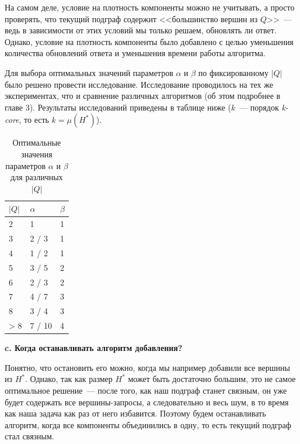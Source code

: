На самом деле, условие на плотность компоненты можно не учитывать, а просто проверять, что текущий подграф содержит <<большинство вершин из $Q$>>~--- ведь в зависимости от этих условий мы только решаем, обновлять ли ответ. Однако, условие на плотность компоненты было добавлено с целью уменьшения количества обновлений ответа и уменьшения времени работы алгоритма.

Для выбора оптимальных значений параметров $\alpha$ и $\beta$ по фиксированному $|Q|$ было решено провести исследование. Исследование проводилось на тех же экспериментах, что и сравнение различных алгоритмов (об этом подробнее в главе $3$). Результаты исследований приведены в таблице ниже ($k$~--- порядок \textit{k-core}, то есть $k = \mu(H^*)$).

\begin{table}[!h]
\centering
\caption{Оптимальные значения параметров $\alpha$ и $\beta$ для различных $|Q|$}\label{parameters-research}
  \begin{tabular}{| l | l | p{1cm} |}
  \hline
  $|Q|$ & $\alpha$ & $\beta$ \\\hline
  2   & 1      & 1        \\\hline
  3   & 2 / 3  & 1        \\\hline
  4   & 1 / 2  & 1        \\\hline
  5   & 3 / 5  & 2        \\\hline
  6   & 2 / 3  & 2        \\\hline
  7   & 4 / 7  & 3        \\\hline
  8   & 3 / 4  & 3        \\\hline
  > 8 & 7 / 10 & 4        \\\hline
  \end{tabular}
\end{table}
\FloatBarrier

\textbf{c. Когда останавливать алгоритм добавления?}

Понятно, что остановить его можно, когда мы например добавили все вершины из $H^*$. Однако, так как размер $H^*$ может быть достаточно большим, это не самое оптимальное решение~--- после того, как наш подграф станет связным, он уже будет содержать все вершины-запросы, а следовательно и весь шум, в то время как наша задача как раз от него избавится. Поэтому будем останавливать алгоритм, когда все компоненты объединились в одну, то есть текущий подграф стал связным.


